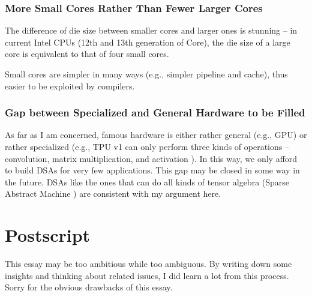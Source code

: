 \documentclass[11pt]{article}
\begin{document}
\subsubsection*{More Small Cores Rather Than Fewer Larger Cores}
The difference of die size between smaller cores and larger ones is stunning -- in current Intel CPUs (12th and 13th generation of Core), the die size of a large core is equivalent to that of four small cores.

Small cores are simpler in many ways (e.g., simpler pipeline and cache), thus easier to be exploited by compilers.

\subsubsection*{Gap between Specialized and General Hardware to be Filled}
As far as I am concerned, famous hardware is either rather general (e.g., GPU) or rather specialized (e.g., TPU v1 can only perform three kinds of operations -- convolution, matrix multiplication, and activation \cite{hennessy2017computer}).
In this way, we only afford to build DSAs for very few applications.
This gap may be closed in some way in the future.
DSAs like the ones that can do all kinds of tensor algebra (Sparse Abstract Machine \cite{hsu2022sparse}) are consistent with my argument here.




\section*{Postscript}
This essay may be too ambitious while too ambiguous.
By writing down some insights and thinking about related issues, I did learn a lot from this process.
Sorry for the obvious drawbacks of this essay.
\end{document}
